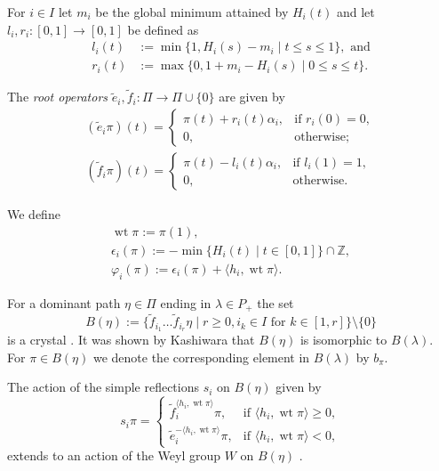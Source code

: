 \documentclass[final]{amsart}
\theoremstyle{plain}
\theoremstyle{definition}
\newcommand{\bbZ}{\mathbb Z}
\newcommand{\te}{\tilde e}
\newcommand{\tf}{\tilde f}
\DeclareMathOperator{\weight}{wt}
\begin{document}
For $i\in I$ let $m_i$ be the global minimum attained by $H_i(t)$ and let $l_i, r_i\colon [0,1] \to [0,1]$ be defined as
\begin{align*}
    l_i(t) &:= \min\{ 1, H_i(s) - m_i \mid t \le s \le 1 \}, \text{ and} \\
    r_i(t) &:= \max\{ 0, 1 + m_i - H_i(s) \mid 0 \le s \le t \}.
\end{align*}

The \emph{root operators} $\te_i, \tf_i\colon \Pi \to \Pi \cup \{ 0 \}$ are given by
\begin{gather*}
    (\te_i \pi)(t) = \begin{cases}
        \pi(t) + r_i(t) \alpha_i, & \text{if } r_i(0) = 0, \\
        0, & \text{otherwise};
    \end{cases} \\
    (\tf_i \pi)(t) = \begin{cases}
        \pi(t) - l_i(t) \alpha_i, & \text{if } l_i(1) = 1, \\
        0, & \text{otherwise}.
    \end{cases}
\end{gather*}

We define
\begin{gather}
    \weight \pi := \pi(1), \\
    \epsilon_i(\pi) := - \min \{ H_i(t) \mid t \in [0, 1] \} \cap \bbZ, \\
    \varphi_i(\pi) := \epsilon_i(\pi) + \langle h_i, \weight \pi \rangle.
\end{gather}

For a dominant path $\eta \in \Pi$ ending in $\lambda \in P_+$ the set
\begin{equation}
    B(\eta) := \{ \tf_{i_1} \dots \tf_{i_r} \eta \mid r \ge 0, i_k \in I \text{ for } k \in [1, r] \} \setminus \{ 0 \}
\end{equation}
is a crystal \cite{Littelmann:LittelwoodRichardsonRule-SymmetrizableKacMoodyAlgebras}.
It was shown by Kashiwara \cite{Kashiwara:Similarity-CrystalBases} that $B(\eta)$ is isomorphic to $B(\lambda)$.
For $\pi \in B(\eta)$ we denote the corresponding element in $B(\lambda)$ by $b_\pi$.

The action of the simple reflections $s_i$ on $B(\eta)$ given by
\[
    s_i \pi =
    \begin{cases}
        \tf_i^{\langle h_i, \weight \pi \rangle} \pi, & \text{if } \langle h_i, \weight \pi \rangle \ge 0, \\
        \te_i^{-\langle h_i, \weight \pi \rangle} \pi, & \text{if } \langle h_i, \weight \pi \rangle < 0,
    \end{cases}
\]
extends to an action of the Weyl group $W$ on $B(\eta)$ \cite{Littelmann:Paths-RootOperators-RepresentationTheory}.
\end{document}

